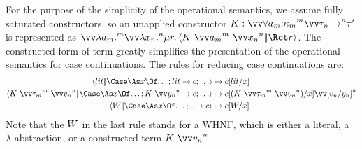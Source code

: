 \documentclass{article}
\begin{document}
For the purpose of the simplicity of the operational semantics, we assume fully
saturated constructors, so an unapplied constructor
$K : \vect[m]{\forall\ann{a_{m}}{\ki_{m}}}\vect[n]{\ty_{n}\to}\ty'$ is
represented as
$
\vect[m]{\fn{a_{m}}}\vect[n]{\fn{x_{n}}}\comp{r}
  \cut{K ~ \vect[m]{a_{m}} ~ \vect[n]{x_{n}}}{\ret r}
$.
The constructed form of term greatly simplifies the presentation of the
operational semantics for case continuations.  The rules for reducing case
continuations are:
\begin{align*}
  \cut{\lit}{\caseas{x}{\dots;\alt{\lit}{\cmd};\dots}}
  &\sred
  \cmd\subst{x}{\lit}
  \\
  \cut
  {K ~ \vect[m]{\ty_{m}} ~ \vect[n]{\tm_{n}}}
  {\caseas{x}{\dots;\alt{K ~ \vect[n]{y_n}}{\cmd};\dots}}
  &\sred
  \cmd
  \subst{x}{(K ~ \vect[m]{\ty_{m}} ~ \vect[n]{\tm_{n}})}
  \vect[n]{\subst{y_n}{\tm_n}}
  \\
  \cut
  {\whnf}
  {\caseas{x}{\dots;\alt{\blank}{\cmd}}}
  &\sred
  \cmd\subst{x}{\whnf}
\end{align*}
Note that the $W$ in the last rule stands for a WHNF, which is either a
literal, a $\lambda$-abstraction, or a constructed term $K ~ \vect[n]{\tm_n}$.
\end{document}
